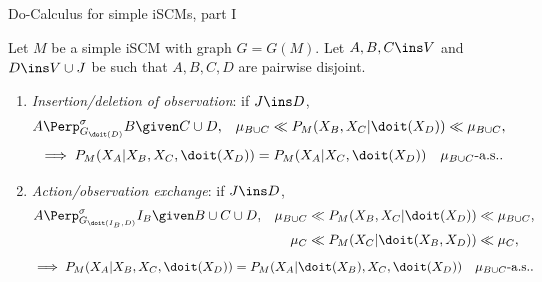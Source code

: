 
\begin{frame}{Do-Calculus for simple iSCMs, part I}
  \begin{Thm}[\ref{thm:as-do-calculus-scms-simplified}]
    Let $M$ be a simple iSCM with graph $G = G(M)$.
    Let $A,B,C \ins V$ and $D \ins V \cup J$ be such that $A,B,C,D$ are pairwise disjoint.
  \small
  \begin{enumerate}
      \item \emph{Insertion/deletion of observation}: if $J \ins D$, 
       \begin{align*} 
           A &\Perp^\sigma_{G_{\doit(D)}} B \given C \cup D, &
           \mu_{B \cup C} &\ll P_M(X_B,X_C|\doit(X_{D}))\ll \mu_{B \cup C},
       \end{align*}
          \[ \implies P_M(X_A|X_B,X_C,\doit(X_{D})) = P_M(X_A|X_C,\doit(X_{D})) \quad \mu_{B \cup C}\text{-a.s.}.\]
     \item \emph{Action/observation exchange}: if $J \ins D$,
       \begin{align*} 
           A & \Perp^\sigma_{G_{\doit(I_B,D)}} I_B \given B \cup C \cup D, &          
                  \mu_{B \cup C} &\ll  P_M(X_B,X_C|\doit(X_{D})) \ll \mu_{B \cup C},\\
               &&   \mu_C &\ll  P_M(X_C|\doit(X_B,X_{D})) \ll \mu_C,
       \end{align*}
       \[ \implies P_M(X_A|X_B,X_C,\doit(X_{D}))  = P_M(X_A|\doit(X_B),X_C,\doit(X_{D})) \quad \mu_{B \cup C}\text{-a.s.}.\]
    \end{enumerate}
\end{Thm}
\end{frame}

